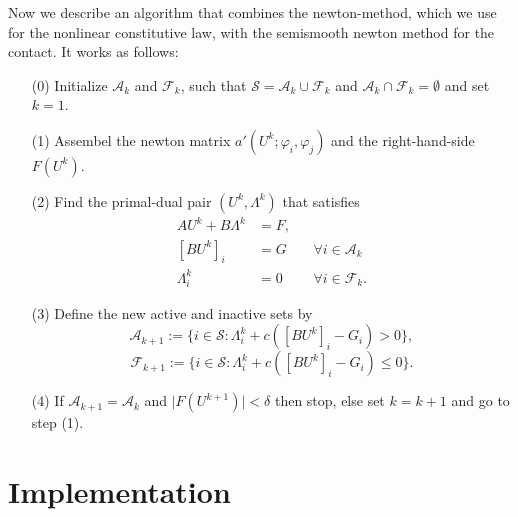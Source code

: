 \documentclass{article}
\begin{document}
Now we describe an algorithm that combines the newton-method, which we use for
the nonlinear constitutive law, with the semismooth newton method for the contact. It
works as follows:
\begin{itemize}
 \item[(0)] Initialize $\mathcal{A}_k$ and $\mathcal{F}_k$, such that $\mathcal{S} = \mathcal{A}_k \cup \mathcal{F}_k$ and $\mathcal{A}_k \cap \mathcal{F}_k = \emptyset$ and set $k = 1$.
 \item[(1)] Assembel the newton matrix $a'(U^k;\varphi_i,\varphi_j)$ and the right-hand-side $F(U^k)$.
 \item[(2)] Find the primal-dual pair $(U^k,\Lambda^k)$ that satisfies
 \begin{align*}
 AU^k + B\Lambda^k & = F, &\\
 \left[BU^k\right]_i & = G & & \forall i\in\mathcal{A}_k\\
 \Lambda^k_i & = 0 & & \forall i\in\mathcal{F}_k.
 \end{align*}
 \item[(3)] Define the new active and inactive sets by
 $$\mathcal{A}_{k+1}:=\lbrace i\in\mathcal{S}:\Lambda^k_i +
 c\left(\left[BU^k\right]_i - G_i\right) > 0\rbrace,$$
 $$\mathcal{F}_{k+1}:=\lbrace i\in\mathcal{S}:\Lambda^k_i +
 c\left(\left[BU^k\right]_i - G_i\right) \leq 0\rbrace.$$
 \item[(4)] If $\mathcal{A}_{k+1} = \mathcal{A}_k$ and $\vert
 F\left(U^{k+1}\right) \vert < \delta$ then stop, else set $k=k+1$ and go to
 step (1).
\end{itemize}

\section{Implementation}
\end{document}
